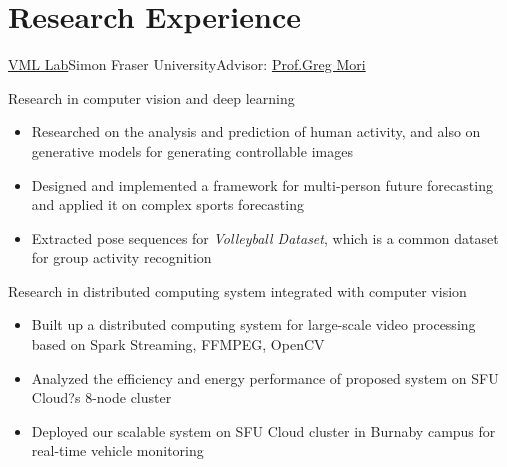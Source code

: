 \documentclass[11pt,a4paper,sans]{moderncv}   %
\begin{document}
\section{Research Experience}
{\newline \href{http://vml.cs.sfu.ca/}{VML Lab}}{Simon Fraser University}{Advisor: \href{http://www.cs.sfu.ca/~mori/}{Prof.Greg Mori}}
{Research in computer vision and deep learning%
\begin{itemize}%
\item Researched on the analysis and prediction of human activity, and also on generative models for generating controllable images
\item Designed and implemented a framework for multi-person future forecasting and applied it on complex sports forecasting
\item Extracted pose sequences for \textit{Volleyball Dataset}, which is a common dataset for group activity recognition
\end{itemize}}

{Research in distributed computing system integrated with computer vision%
\begin{itemize}%
\item Built up a distributed computing system for large-scale video processing based on Spark Streaming, FFMPEG, OpenCV
\item Analyzed the efficiency and energy performance of proposed system on SFU Cloud?s 8-node cluster
\item Deployed our scalable system on SFU Cloud cluster in Burnaby campus for real-time vehicle monitoring
\end{itemize}
}
\end{document}
